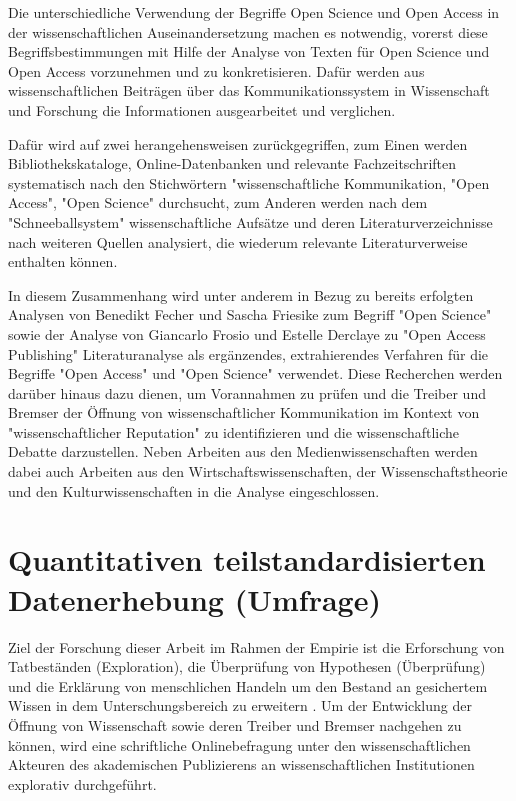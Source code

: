 Die unterschiedliche Verwendung der Begriffe Open Science und Open Access in der wissenschaftlichen Auseinandersetzung machen es notwendig, vorerst diese Begriffsbestimmungen mit Hilfe der Analyse von Texten für Open Science und Open Access vorzunehmen und zu konkretisieren. Dafür werden aus wissenschaftlichen Beiträgen über das Kommunikationssystem in Wissenschaft und Forschung die Informationen ausgearbeitet und verglichen.

Dafür wird auf zwei herangehensweisen zurückgegriffen, zum Einen werden Bibliothekskataloge, Online-Datenbanken und relevante Fachzeitschriften systematisch nach den Stichwörtern "wissenschaftliche Kommunikation, "Open Access", "Open Science" durchsucht, zum Anderen werden nach dem "Schneeballsystem" wissenschaftliche Aufsätze und deren Literaturverzeichnisse nach weiteren Quellen analysiert, die wiederum relevante Literaturverweise enthalten können.

In diesem Zusammenhang wird unter anderem in Bezug zu bereits erfolgten Analysen von Benedikt Fecher und Sascha Friesike zum Begriff "Open Science"\cite{cite:9} sowie der Analyse von Giancarlo Frosio und Estelle Derclaye zu "Open Access Publishing" \cite{CREATe_2014} Literaturanalyse als ergänzendes, extrahierendes Verfahren für die Begriffe "Open Access" und "Open Science" verwendet. Diese Recherchen werden darüber hinaus dazu dienen, um Vorannahmen zu prüfen und die Treiber und Bremser der Öffnung von wissenschaftlicher Kommunikation im Kontext von "wissenschaftlicher Reputation" zu identifizieren und die wissenschaftliche Debatte darzustellen. Neben Arbeiten aus den Medienwissenschaften werden dabei auch Arbeiten aus den Wirtschaftswissenschaften, der Wissenschaftstheorie und den Kulturwissenschaften in die Analyse eingeschlossen.

\section{Quantitativen teilstandardisierten Datenerhebung (Umfrage)}

Ziel der Forschung dieser Arbeit im Rahmen der Empirie ist die Erforschung von Tatbeständen (Exploration), die Überprüfung von Hypothesen (Überprüfung) \cite{raab_2012_fragebogen} und die Erklärung von menschlichen Handeln \cite{atteslander_2008_methoden} um den Bestand an gesichertem Wissen in dem Unterschungsbereich zu erweitern \cite{bortz_Doering_2006_fragestellung}. Um der Entwicklung der Öffnung von Wissenschaft sowie deren Treiber und Bremser nachgehen zu können, wird eine schriftliche Onlinebefragung unter den wissenschaftlichen Akteuren des akademischen Publizierens an wissenschaftlichen Institutionen explorativ durchgeführt.

